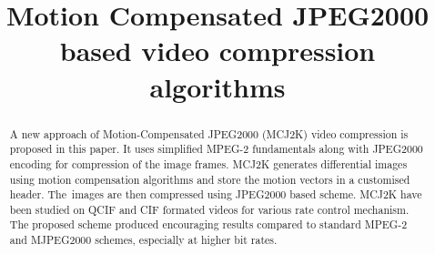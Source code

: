 \documentclass{doublecol-new}
\theoremstyle{TH}{
\newtheorem{lemma}{Lemma}[section]
\newtheorem{theorem}{Theorem}
\newtheorem{corrolary}{Corrolary}
\newtheorem{conjecture}[lemma]{Conjecture}
\newtheorem{proposition}[lemma]{Proposition}
\newtheorem{claim}[lemma]{Claim}
\newtheorem{stheorem}[lemma]{Wrong Theorem}
}
\theoremstyle{THrm}{
\newtheorem{definition}{Definition}[section]
\newtheorem{question}{Question}[section]
\newtheorem{remark}{Remark}[section]
\newtheorem{scheme}{Scheme}
}
\theoremstyle{THhit}{
\newtheorem{case}{Case}[section]
}
\begin{document}
%

\thispagestyle{plain}

\setcounter{page}{197}







\title{Motion Compensated JPEG2000 based video compression algorithms}






\begin{abstract}
A new approach of Motion-Compensated JPEG2000 (MCJ2K) video compression is
proposed in this paper. It uses simplified MPEG-2 fundamentals along with
JPEG2000 encoding for compression of the image frames. MCJ2K generates
differential images using motion compensation algorithms and store the motion
vectors in a customised header. The~images are then compressed using JPEG2000
based scheme. MCJ2K have been studied on QCIF and CIF formated videos for
various rate control mechanism. The proposed scheme produced encouraging results
compared to standard MPEG-2 and MJPEG2000 schemes, especially at higher bit
rates.
\end{abstract}
\end{document}
